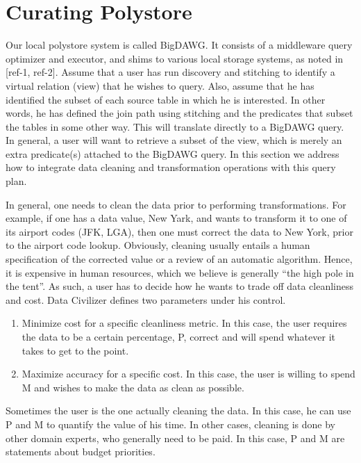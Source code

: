 \section{Curating Polystore}
\label{sec:curating}

Our local polystore system is called BigDAWG.  It consists of a middleware query
optimizer and executor, and shims to various local storage systems, as noted in
[ref-1, ref-2].  Assume that a user has run discovery and stitching to identify
a virtual relation (view) that he wishes to query.  Also, assume that he has
identified the subset of each source table in which he is interested.  In other
words, he has defined the join path using stitching and the predicates that
subset the tables in some other way.  This will translate directly to a BigDAWG
query.  In general, a user will want to retrieve a subset of the view, which is
merely an extra predicate(s) attached to the BigDAWG query.   In this section we
address how to integrate data cleaning and transformation operations with this
query plan.

In general, one needs to clean the data prior to performing transformations.
For example, if one has a data value, New Yark, and wants to transform it to one
of its airport codes (JFK, LGA), then one must correct the data to New York,
prior to the airport code lookup.  Obviously, cleaning usually entails a human
specification of the corrected value or a review of an automatic algorithm.
Hence, it is expensive in human resources, which we believe is generally “the
high pole in the tent”.  As such, a user has to decide how he wants to trade off
data cleanliness and cost.  Data Civilizer defines two parameters under his
control.

\begin{enumerate}
\item Minimize cost for a specific cleanliness metric.  In this case, the
user requires the data to be a certain percentage, P, correct and will spend
whatever it takes to get to the point.
\item Maximize accuracy for a specific cost.  In this case, the user is
willing to spend M and wishes to make the data as clean as possible.
\end{enumerate}

Sometimes the user is the one actually cleaning the data.  In this case, he can
use P and M to quantify the value of his time.  In other cases, cleaning is done
by other domain experts, who generally need to be paid.  In this case, P and M
are statements about budget priorities.

